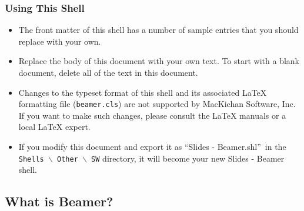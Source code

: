 \documentclass[notes=show]{beamer}%
\begin{document}
\begin{frame}%
%

\frametitle{Using This Shell}%


\begin{itemize}
\item The front matter of this shell has a number of sample entries that you
should replace with your own.

\item Replace the body of this document with your own text. To start with a
blank document, delete all of the text in this document.

\item Changes to the typeset format of this shell and its associated \LaTeX{}
formatting file (\texttt{beamer.cls}) are not supported by MacKichan Software,
Inc. If you want to make such changes, please consult the \LaTeX{} manuals or
a local \LaTeX{} expert.

\item If you modify this document and export it as \textquotedblleft Slides -
Beamer.shl\textquotedblright\ in the \texttt{Shells%
$\backslash$%
Other%
$\backslash$%
SW} directory, it will become your new Slides - Beamer shell.
\end{itemize}%

\end{frame}%


\subsection{What is Beamer?}%
\end{document}
